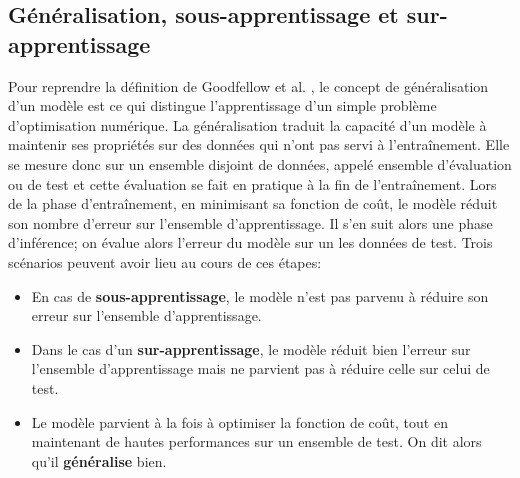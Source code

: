 \subsection{Généralisation, sous-apprentissage et sur-apprentissage}
Pour reprendre la définition de Goodfellow et al. \cite{Goodfellow-et-al-2016}, le concept de généralisation d'un modèle est ce qui distingue l'apprentissage d'un \og simple \fg problème d'optimisation numérique. La généralisation traduit la capacité d'un modèle à maintenir ses propriétés sur des données qui n'ont pas servi à l'entraînement. Elle se mesure donc sur un ensemble disjoint de données, appelé ensemble d'évaluation ou de test et cette évaluation se fait en pratique à la fin de l'entraînement. Lors de la phase d'entraînement, en minimisant sa fonction de coût, le modèle réduit son nombre d'erreur sur l'ensemble d'apprentissage. Il s'en suit alors une phase d'inférence; on évalue alors l'erreur du modèle sur un les données de test. Trois scénarios peuvent avoir lieu au cours de ces étapes:
\begin{itemize}
	\item En cas de \textbf{sous-apprentissage}, le modèle n'est pas parvenu à réduire son erreur sur l'ensemble d'apprentissage. 
	\item Dans le cas d'un \textbf{sur-apprentissage}, le modèle réduit bien l'erreur sur l'ensemble d'apprentissage mais ne parvient pas à réduire celle sur celui de test. 
	\item Le modèle parvient à la fois à optimiser la fonction de coût, tout en maintenant de hautes performances sur un ensemble de test. On dit alors qu'il \textbf{généralise} bien.
\end{itemize}

